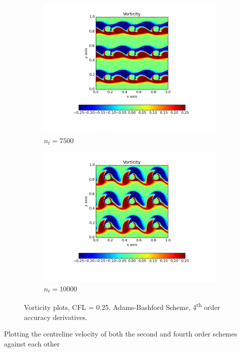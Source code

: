 \documentclass[10pt, a4paper]{article}
\begin{document}
\begin{figure}[htb!]
\begin{subfigure}{.5\textwidth}
  \includegraphics[width=1.1\linewidth, clip=true, trim=1cm 2cm 1cm 1cm]{q5_0003}
  \caption{$n_t = 7500$}
\end{subfigure}%
\begin{subfigure}{.5\textwidth}
  \centering
  \includegraphics[width=1.1\linewidth, clip=true, trim=1cm 2cm 1cm 1cm]{q5_0004}
  \caption{$n_t = 10000$}
\end{subfigure}
\caption{Vorticity plots, CFL = 0.25, Adams-Bashford Scheme, 4\textsuperscript{th} order accuracy derivatives.}
\label{fig:q5}
\end{figure}

Plotting the centreline velocity of both the second and fourth order schemes against each other
\end{document}
